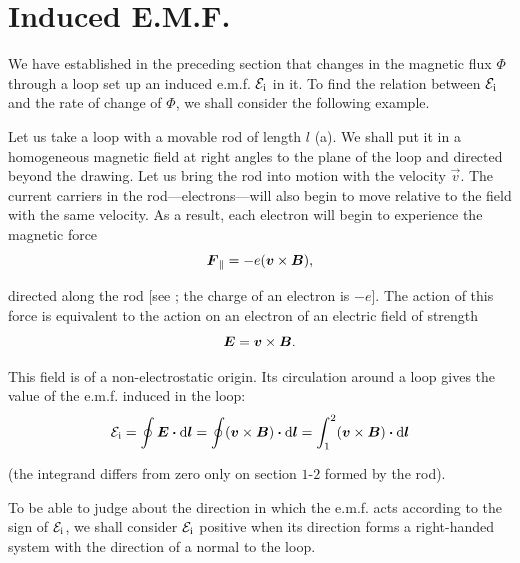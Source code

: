 \section{Induced E.M.F.}\label{sec:8_2}

We have established in the preceding section that changes in the magnetic flux $\Phi$ through a loop set up an induced e.m.f. $\mathcal{E}_{\text{i}}$ in it.
To find the relation between $\mathcal{E}_{\text{i}}$ and the rate of change of $\Phi$, we shall consider the following example.

Let us take a loop with a movable rod of length $l$ (a).
We shall put it in a homogeneous magnetic field at right angles to the plane of the loop and directed beyond the drawing.
Let us bring the rod into motion with the velocity $\vec{v}$.
The current carriers in the rod---electrons---will also begin to move relative to the field with the same velocity.
As a result, each electron will begin to experience the magnetic force
\begin{equation}\label{eq:8_1}
    \boldsymbol{F}_{\parallel} = -e (\boldsymbol{v}\times\boldsymbol{B}),
\end{equation}

\noindent
directed along the rod [see ; the charge of an electron is $-e$].
The action of this force is equivalent to the action on an electron of an electric field of strength
\begin{equation*}
    \boldsymbol{E} = \boldsymbol{v}\times\boldsymbol{B}.
\end{equation*}

\noindent
This field is of a non-electrostatic origin. Its circulation around a loop gives the value of the e.m.f. induced in the loop:
\begin{equation}\label{eq:8_2}
    \mathcal{E}_{\text{i}} = \oint \boldsymbol{E} \boldsymbol{\cdot} \mathrm{d}\boldsymbol{l} = \oint (\boldsymbol{v}\times\boldsymbol{B}) \boldsymbol{\cdot} \mathrm{d}\boldsymbol{l} = \int_1^2 (\boldsymbol{v}\times\boldsymbol{B}) \boldsymbol{\cdot} \mathrm{d}\boldsymbol{l}
\end{equation}

\noindent
(the integrand differs from zero only on section $1$-$2$ formed by the rod).

To be able to judge about the direction in which the e.m.f. acts according to the sign of $\mathcal{E}_{\text{i}}$, we shall consider $\mathcal{E}_{\text{i}}$ positive when its direction forms a right-handed system with the direction of a normal to the loop.

